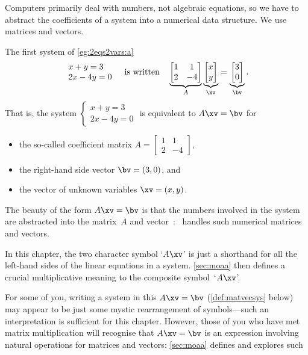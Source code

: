 Computers primarily deal with numbers, not algebraic equations, so we have to abstract the coefficients of a system into a numerical data structure.
We use matrices and vectors.
\begin{example} 
The first system of \cref{eg:2eqs2vars:a}
\begin{equation*}
\begin{array}{l} x+y=3\\2x-4y=0 \end{array}
\quad\text{is written}\quad
\underbrace{\begin{bmatrix} 1&1\\2&-4 \end{bmatrix}}_A
\underbrace{\begin{bmatrix} x\\y \end{bmatrix}}_\xv
=\underbrace{\begin{bmatrix} 3\\0 \end{bmatrix}}_\bv .
\end{equation*}
That is, the system \(\begin{cases} x+y=3\\2x-4y=0 \end{cases}\)
is equivalent to \(A\xv=\bv\) for
\begin{itemize}
\item the so-called coefficient matrix \(A=\begin{bmatrix} 1&1\\2&-4 \end{bmatrix}\), 
\item the right-hand side vector \(\bv=(3,0)\), and 
\item the vector of unknown variables \(\xv=(x,y)\).
\end{itemize}

\end{example}


The beauty of the form \(A\xv=\bv\) is that the numbers involved in the system are abstracted into the matrix~\(A\) and vector~\bv: \script\ handles such numerical matrices and vectors.
\begin{aside}
In this chapter, the two character symbol `\(A\xv\)' is just a shorthand for all the left-hand sides of the linear equations in a system.
\cref{sec:moaa} then defines a crucial multiplicative meaning to the composite symbol~`\(A\xv\)'. 
\end{aside}%
For some of you, writing a system in this  \(A\xv=\bv\) (\cref{def:matvecsys} below) may appear to be just some mystic rearrangement of symbols---such an interpretation is sufficient for this chapter.
However, those of you who have met matrix multiplication will recognise that \(A\xv=\bv\) is an expression involving natural operations for matrices and vectors: \cref{sec:moaa} defines and explores such 

